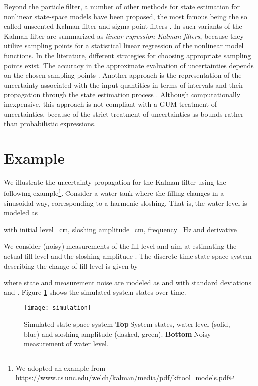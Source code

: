 \documentclass[10pt]{article}
\begin{document}
\begin{spacing}{1}
Beyond the particle filter, a number of other methods for state estimation for nonlinear state-space models have been proposed, the most famous being the so called unscented Kalman filter \cite{Julier:2004go} and sigma-point filters \cite{VanderMerwe:2004tj}. In \cite{Lefebvre:2004jg} such variants of the Kalman filter are summarized as \emph{linear regression Kalman filters}, because they utilize sampling points for a statistical linear regression of the nonlinear model functions. In the literature, different strategies for choosing appropriate sampling points exist. The accuracy in the approximate evaluation of uncertainties depends on the chosen sampling points \cite{Lefebvre:2004jg}.
Another approach is the representation of the uncertainty associated with the input quantities in terms of intervals and their propagation through the state estimation process \cite{Souto:2009bj}. Although computationally inexpensive, this approach is not compliant with a GUM treatment of uncertainties, because of the strict treatment of uncertainties as bounds rather than probabilistic expressions.

\section{Example}
\label{sec:example}
We illustrate the uncertainty propagation for the Kalman filter using the following example\footnote{We adopted an example from https://www.cs.unc.edu/welch/kalman/media/pdf/kftool\_models.pdf}. Consider a water tank where the filling changes in a sinusoidal way, corresponding to a harmonic sloshing. That is, the water level is modeled as

with initial level ~cm, sloshing amplitude ~cm, frequency ~Hz and derivative

We consider (noisy) measurements of the fill level and aim at estimating the actual fill level  and the sloshing amplitude . 
The discrete-time state-space system describing the change of fill level is given by



where state and measurement noise are modeled as  and  with standard deviations  and . Figure \ref{fig:simulated} shows the simulated system states over time. 

\begin{figure}[h!]
	\centering 
	\texttt{[image: simulation]}
	\caption{Simulated state-space system \textbf{Top} System states, water level (solid, blue) and sloshing amplitude (dashed, green). \textbf{Bottom} Noisy measurement of water level.}
\label{fig:simulated}
\end{figure}


\end{spacing}
\end{document}
